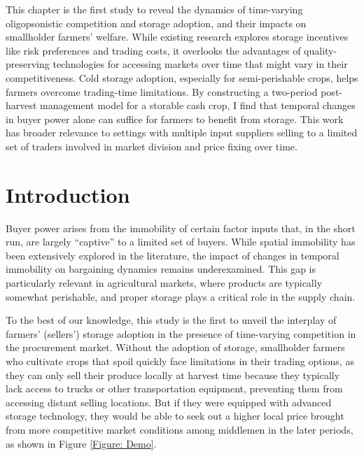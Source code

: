 \noindent
This chapter is the first study to reveal the dynamics of time-varying oligopsonistic competition and storage adoption, and their impacts on smallholder farmers' welfare. While existing research explores storage incentives like risk preferences and trading costs, it overlooks the advantages of quality-preserving technologies for accessing markets over time that might vary in their competitiveness. Cold storage adoption, especially for semi-perishable crops, helps farmers overcome trading-time limitations. By constructing a two-period post-harvest management model for a storable cash crop, I find that temporal changes in buyer power alone can suffice for farmers to benefit from storage. This work has broader relevance to settings with multiple input suppliers selling to a limited set of traders involved in market division and price fixing over time.

\section{Introduction}
\noindent    
Buyer power arises from the immobility of certain factor inputs that, in the short run, are largely ``captive'' to a limited set of buyers. While spatial immobility has been extensively explored in the literature, the impact of changes in temporal immobility on bargaining dynamics remains underexamined. This gap is particularly relevant in agricultural markets, where products are typically somewhat perishable, and proper storage plays a critical role in the supply chain.


To the best of our knowledge, this study is the first to unveil the interplay of farmers' (sellers') storage adoption in the presence of time-varying competition in the procurement market. Without the adoption of storage, smallholder farmers who cultivate crops that spoil quickly face limitations in their trading options, as they can only sell their produce locally at harvest time because they typically lack access to trucks or other transportation equipment, preventing them from accessing distant selling locations. But if they were equipped with advanced storage technology, they would be able to seek out a higher local price brought from more competitive market conditions among middlemen in the later periods, as shown in Figure \ref{Figure: Demo}.

